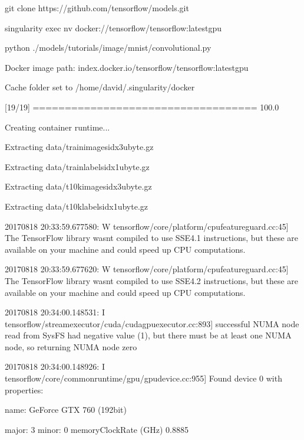 \documentclass[letterpaper,10pt,english]{sphinxmanual}
\begin{document}
%
\begin{sphinxVerbatim}[commandchars=\\\{\}]
\PYGZdl{} git clone https://github.com/tensorflow/models.git

\PYGZdl{} singularity exec \PYGZhy{}\PYGZhy{}nv docker://tensorflow/tensorflow:latest\PYGZhy{}gpu \PYGZbs{}

    python ./models/tutorials/image/mnist/convolutional.py

Docker image path: index.docker.io/tensorflow/tensorflow:latest\PYGZhy{}gpu

Cache folder set to /home/david/.singularity/docker

[19/19] \textbar{}===================================\textbar{} 100.0\PYGZpc{}

Creating container runtime...

Extracting data/train\PYGZhy{}images\PYGZhy{}idx3\PYGZhy{}ubyte.gz

Extracting data/train\PYGZhy{}labels\PYGZhy{}idx1\PYGZhy{}ubyte.gz

Extracting data/t10k\PYGZhy{}images\PYGZhy{}idx3\PYGZhy{}ubyte.gz

Extracting data/t10k\PYGZhy{}labels\PYGZhy{}idx1\PYGZhy{}ubyte.gz

2017\PYGZhy{}08\PYGZhy{}18 20:33:59.677580: W tensorflow/core/platform/cpu\PYGZus{}feature\PYGZus{}guard.cc:45] The TensorFlow library wasn\PYGZsq{}t compiled to use SSE4.1 instructions, but these are available on your machine and could speed up CPU computations.

2017\PYGZhy{}08\PYGZhy{}18 20:33:59.677620: W tensorflow/core/platform/cpu\PYGZus{}feature\PYGZus{}guard.cc:45] The TensorFlow library wasn\PYGZsq{}t compiled to use SSE4.2 instructions, but these are available on your machine and could speed up CPU computations.

2017\PYGZhy{}08\PYGZhy{}18 20:34:00.148531: I tensorflow/stream\PYGZus{}executor/cuda/cuda\PYGZus{}gpu\PYGZus{}executor.cc:893] successful NUMA node read from SysFS had negative value (\PYGZhy{}1), but there must be at least one NUMA node, so returning NUMA node zero

2017\PYGZhy{}08\PYGZhy{}18 20:34:00.148926: I tensorflow/core/common\PYGZus{}runtime/gpu/gpu\PYGZus{}device.cc:955] Found device 0 with properties:

name: GeForce GTX 760 (192\PYGZhy{}bit)

major: 3 minor: 0 memoryClockRate (GHz) 0.8885


\end{sphinxVerbatim}
\end{document}
